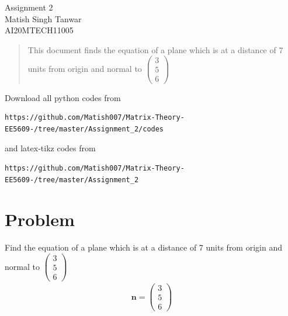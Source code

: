 \documentclass[journal,12pt,twocolumn]{IEEEtran}
\begin{document}
\begin{center}
\huge Assignment 2\\

\large Matish Singh Tanwar\\
\large AI20MTECH11005\\
\end{center}
\vspace{1.0cm}
\begin{abstract}
This document finds the equation of a plane which is at a distance of 7 units from origin and normal to $\begin{pmatrix}3\\5\\6\end{pmatrix}$
\end{abstract}
\vspace{0.5cm}
Download all python codes from 
\begin{lstlisting}
https://github.com/Matish007/Matrix-Theory-EE5609-/tree/master/Assignment_2/codes
\end{lstlisting}
%
and latex-tikz codes from 
\begin{lstlisting}
https://github.com/Matish007/Matrix-Theory-EE5609-/tree/master/Assignment_2
\end{lstlisting}
%
\vspace{0.5mm}
\section{Problem}
Find the equation of a plane which is at a distance of 7 units from origin and normal to $\begin{pmatrix}3\\5\\6\end{pmatrix}$\\
\begin{align}\label{1}
    \mathbf{n}=\begin{pmatrix}3\\5\\6\end{pmatrix}
\end{align}
\end{document}
